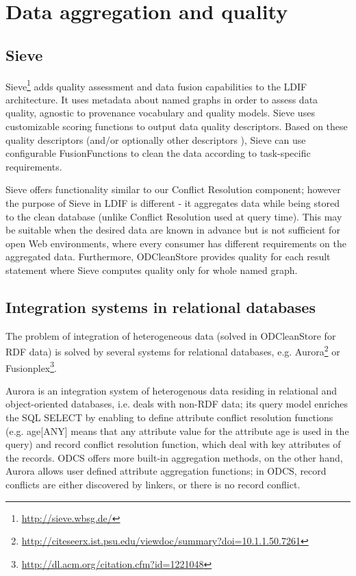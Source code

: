 \section{Data aggregation and quality}

\subsection*{Sieve}
Sieve\footnote{\url{http://sieve.wbsg.de/}} adds quality assessment and data fusion capabilities to the LDIF architecture. It uses metadata about named graphs in order to assess data quality, agnostic to provenance vocabulary and quality models. Sieve uses customizable scoring functions to output data quality descriptors. Based on these quality descriptors (and/or optionally other descriptors ), Sieve can use configurable FusionFunctions to clean the data according to task-specific requirements.

Sieve offers functionality similar to our Conflict Resolution component; however the purpose of Sieve in LDIF is different - it aggregates data while being stored to the clean database (unlike Conflict Resolution used at query time). This may be suitable when the desired data are known in advance but is not sufficient for open Web environments, where every consumer has different requirements on the aggregated data. Furthermore, ODCleanStore provides quality for each result statement where Sieve computes quality only for whole named graph.

\subsection*{Integration systems in relational databases}

The problem of integration of heterogeneous data (solved in ODCleanStore for RDF data) is solved by several systems for relational databases, e.g. Aurora\footnote{\url{http://citeseerx.ist.psu.edu/viewdoc/summary?doi=10.1.1.50.7261}} or Fusionplex\footnote{\url{http://dl.acm.org/citation.cfm?id=1221048}}.


Aurora is an integration system of heterogenous data residing in relational and object-oriented databases, i.e. deals with non-RDF data; its query model enriches the SQL SELECT by enabling to define attribute conflict resolution functions (e.g. age[ANY] means that any attribute value for  the attribute age is used in the query) and record conflict  resolution function, which deal with key attributes of the records.   ODCS offers more built-in aggregation methods, on the other hand, Aurora allows user defined attribute aggregation functions; in ODCS, record conflicts are either discovered by linkers, or there is no record conflict.


